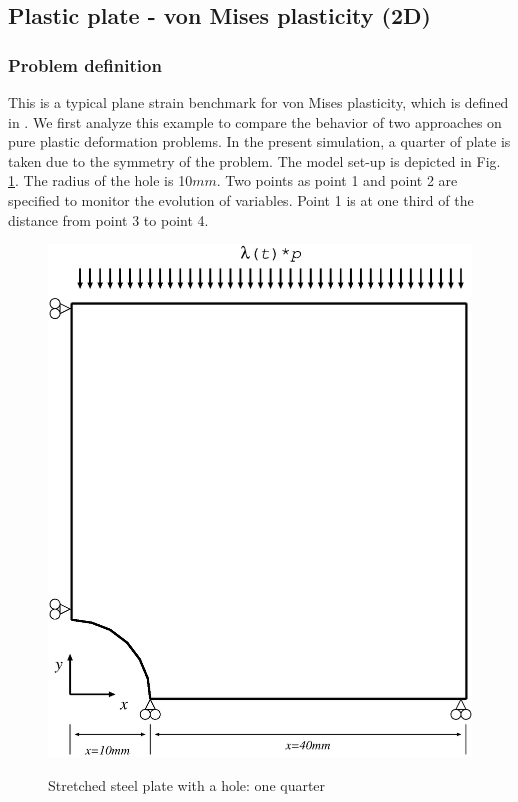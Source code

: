 \subsection{Plastic plate - von Mises plasticity (2D)}

\subsubsection*{Problem definition}

This is a typical plane strain benchmark for von Mises plasticity,
which is defined in \cite{SteEtAl:03}. We first analyze this example
to compare the behavior of two approaches on pure plastic
deformation problems. In the present simulation, a  quarter of plate
is taken due to the symmetry of the problem. The model set-up is
depicted in Fig. \ref{ex1_model}. The radius of the hole is 10$mm$.
Two points as point 1 and point 2 are specified to monitor the
evolution of variables. Point 1 is at  one third of the distance
from point 3 to point 4.

\begin{figure}[!htb]
\centering
    \includegraphics[scale=0.3]{M/ex1_model.eps}\\
   \caption{Stretched steel plate with a hole: one quarter}
  \label{ex1_model}
\end{figure}

